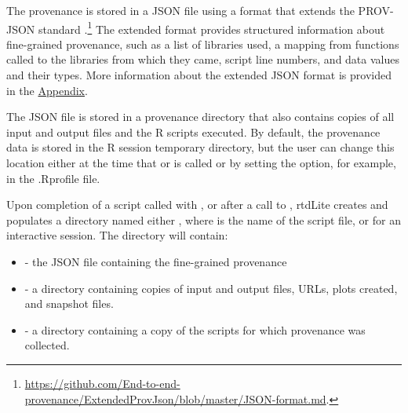 The provenance is stored in a JSON file using a format
that extends the PROV-JSON standard \citep{provjson}.\footnote{\url{https://github.com/End-to-end-provenance/ExtendedProvJson/blob/master/JSON-format.md}.} The extended format provides structured information about fine-grained provenance, such as a list of libraries used, a mapping from functions called to the libraries from which they came, script line numbers, and data values and their types.  More 
information about the extended JSON format is provided in the \hyperlink{sec:ExtendedJSON}{Appendix}.

The JSON file is stored in a provenance directory that also contains copies of all input and output files and the R scripts executed.  By default, the provenance data is stored in the R session temporary directory, but the user can change this location either at the time that  or  is called or by setting the  option, for example, in the .Rprofile file.


Upon completion of a script called with , or after a call to , rtdLite creates and populates a directory named either , where  is the name of the script file, or  for an interactive session.
The directory will contain:
\begin{itemize}
    \item {} - the JSON file containing the fine-grained provenance
    \item {} - a directory containing copies of input and output files, URLs, plots created, and snapshot files.
    \item {} - a directory containing a copy of the scripts for which provenance was collected.%
\end{itemize}

